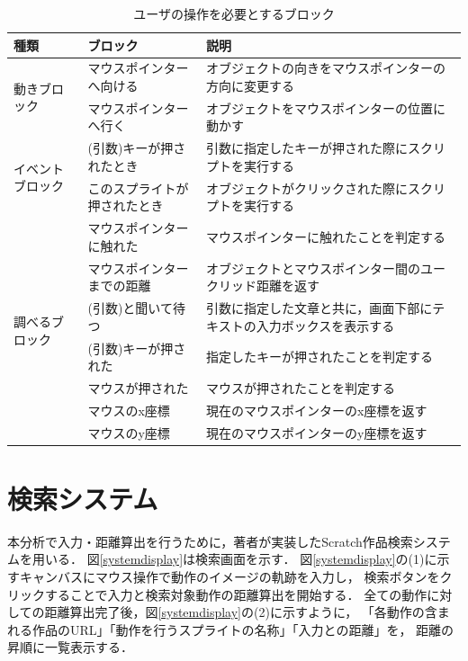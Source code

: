 \documentclass[11pt]{jreport}
\begin{document}
\begin{table}
    \caption{ユーザの操作を必要とするブロック}
    \label{interactionblock}
    \centering
    \begin{tabularx}{\textwidth}{l|l|X}
    \hline
        種類 & ブロック & 説明 \\
        \hline \hline
        \multirow{2}{*}{動きブロック} 
        & マウスポインターへ向ける & オブジェクトの向きをマウスポインターの方向に変更する \\
        \cline{2-3}
        & マウスポインターへ行く & オブジェクトをマウスポインターの位置に動かす \\
        \hline
        \multirow{2}{*}{イベントブロック}
        & (引数)キーが押されたとき & 引数に指定したキーが押された際にスクリプトを実行する \\
        \cline{2-3}
        & このスプライトが押されたとき & オブジェクトがクリックされた際にスクリプトを実行する \\
        \hline
        \multirow{7}{*}{調べるブロック} & マウスポインターに触れた & マウスポインターに触れたことを判定する \\
        \cline{2-3}
        & マウスポインターまでの距離 & オブジェクトとマウスポインター間のユークリッド距離を返す \\
        \cline{2-3}
        & (引数)と聞いて待つ & 引数に指定した文章と共に，画面下部にテキストの入力ボックスを表示する \\
        \cline{2-3}
        & (引数)キーが押された & 指定したキーが押されたことを判定する \\
        \cline{2-3}
        & マウスが押された & マウスが押されたことを判定する \\
        \cline{2-3}
        & マウスのx座標 & 現在のマウスポインターのx座標を返す \\
        \cline{2-3}
        & マウスのy座標 & 現在のマウスポインターのy座標を返す \\
        \hline
    \end{tabularx}
\end{table}

\section{検索システム}
本分析で入力・距離算出を行うために，著者が実装したScratch作品検索システムを用いる．
図\ref{systemdisplay}は検索画面を示す．
図\ref{systemdisplay}の(1)に示すキャンバスにマウス操作で動作のイメージの軌跡を入力し，
検索ボタンをクリックすることで入力と検索対象動作の距離算出を開始する．
全ての動作に対しての距離算出完了後，図\ref{systemdisplay}の(2)に示すように，
「各動作の含まれる作品のURL」「動作を行うスプライトの名称」「入力との距離」を，
距離の昇順に一覧表示する．
\end{document}

